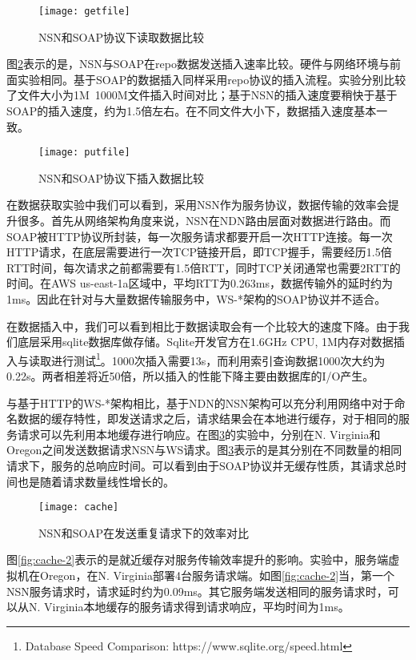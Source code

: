 \begin{figure}[H]
  \centering
  \texttt{[image: getfile]}
  \caption{NSN和SOAP协议下读取数据比较}
  \label{fig:getfile}
\end{figure}

图\ref{fig:putfile}表示的是，NSN与SOAP在repo数据发送插入速率比较。硬件与网络环境与前面实验相同。基于SOAP的数据插入同样采用repo协议的插入流程。实验分别比较了文件大小为1M~1000M文件插入时间对比；基于NSN的插入速度要稍快于基于SOAP的插入速度，约为1.5倍左右。在不同文件大小下，数据插入速度基本一致。


\begin{figure}[H]
  \centering
  \texttt{[image: putfile]}
  \caption{NSN和SOAP协议下插入数据比较}
  \label{fig:putfile}
\end{figure}

在数据获取实验中我们可以看到，采用NSN作为服务协议，数据传输的效率会提升很多。首先从网络架构角度来说，NSN在NDN路由层面对数据进行路由。而SOAP被HTTP协议所封装，每一次服务请求都要开启一次HTTP连接。每一次HTTP请求，在底层需要进行一次TCP链接开启，即TCP握手，需要经历1.5倍RTT时间，每次请求之前都需要有1.5倍RTT，同时TCP关闭通常也需要2RTT的时间。在AWS us-east-1a区域中，平均RTT为0.263ms，数据传输外的延时约为1ms。因此在针对与大量数据传输服务中，WS-*架构的SOAP协议并不适合。

在数据插入中，我们可以看到相比于数据读取会有一个比较大的速度下降。由于我们底层采用sqlite数据库做存储。Sqlite开发官方在1.6GHz CPU, 1M内存对数据插入与读取进行测试\footnote{Database Speed Comparison: https://www.sqlite.org/speed.html}。1000次插入需要13s，而利用索引查询数据1000次大约为0.22s。两者相差将近50倍，所以插入的性能下降主要由数据库的I/O产生。

与基于HTTP的WS-*架构相比，基于NDN的NSN架构可以充分利用网络中对于命名数据的缓存特性，即发送请求之后，请求结果会在本地进行缓存，对于相同的服务请求可以先利用本地缓存进行响应。在图\ref{fig:cache}的实验中，分别在N. Virginia和Oregon之间发送数据请求NSN与WS请求。图\ref{fig:cache}表示的是其分别在不同数量的相同请求下，服务的总响应时间。可以看到由于SOAP协议并无缓存性质，其请求总时间也是随着请求数量线性增长的。

\begin{figure}[H]
  \centering
  \texttt{[image: cache]}
  \caption{NSN和SOAP在发送重复请求下的效率对比}
  \label{fig:cache}
\end{figure}

图\ref{fig:cache-2}表示的是就近缓存对服务传输效率提升的影响。实验中，服务端虚拟机在Oregon，在N. Virginia部署4台服务请求端。如图\ref{fig:cache-2}当，第一个NSN服务请求时，请求延时约为0.09ms。其它服务端发送相同的服务请求时，可以从N. Virginia本地缓存的服务请求得到请求响应，平均时间为1ms。

